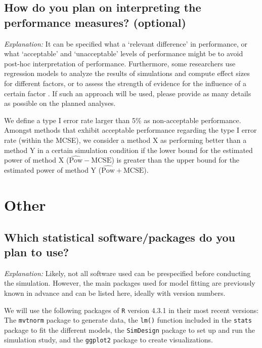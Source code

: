 \documentclass[12pt]{article}
\begin{document}
\subsection{How do you plan on interpreting the performance measures? \textmd{(optional)}}

\textit{Explanation:} It can be specified what a `relevant difference' in performance, or what `acceptable' and `unacceptable' levels of performance might be to avoid post-hoc interpretation of performance. Furthermore, some researchers use regression models to analyze the results of simulations and compute effect sizes for different factors, or to assess the strength of evidence for the influence of a certain factor \parencite{Skrondal2000, Chipman2022}. If such an approach will be used, please provide as many details as possible on the planned analyses.

\begin{examplebox}
We define a type I error rate larger than 5\% as non-acceptable performance. Amongst methods that exhibit acceptable performance regarding the type I error rate (within the MCSE), we consider a method X as performing better than a method Y in a certain simulation condition if the lower bound for the estimated power of method X ($\widehat{\text{Pow}}-\text{MCSE}$) is greater than the upper bound for the estimated power of method Y ($\widehat{\text{Pow}}+\text{MCSE}$).
\end{examplebox}


\section{Other}
\subsection{Which statistical software/packages do you plan to use?}
\textit{Explanation:} Likely, not all software used can be prespecified before conducting the simulation. However, the main packages used for model fitting are previously known in advance and can be listed here, ideally with version numbers.

\begin{examplebox}
We will use the following packages of \texttt{R} version 4.3.1 \parencite{R2020} in their most recent versions: The \texttt{mvtnorm} package \parencite{Genz2009} to generate data, the \texttt{lm()} function included in the \texttt{stats} package \parencite{R2020} to fit the different models, the \texttt{SimDesign} package \parencite{Chalmers2020} to set up  and run the simulation study, and the \texttt{ggplot2} package \parencite{Wickham2016} to create visualizations.
\end{examplebox}
\end{document}
